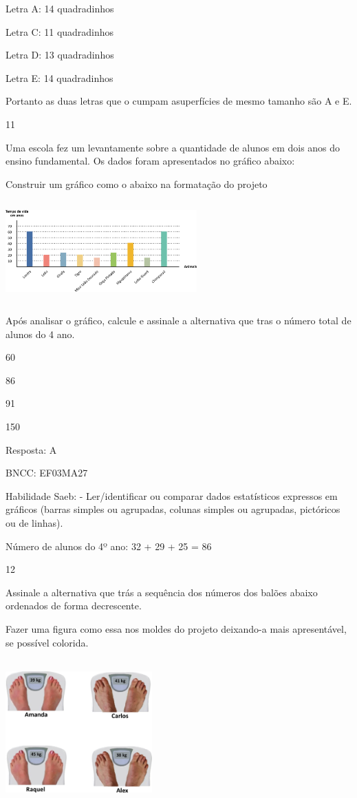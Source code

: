 \begin{escolha}
{\begin{escolha}
{Letra A: 14 quadradinhos

Letra C: 11 quadradinhos

Letra D: 13 quadradinhos

Letra E: 14 quadradinhos

Portanto as duas letras que o cumpam asuperfícies de mesmo tamanho são A
e E.

\num{11}

Uma escola fez um levantamente sobre a quantidade de alunos em dois anos
do ensino fundamental. Os dados foram apresentados no gráfico abaixo:

Construir um gráfico como o abaixo na formatação do projeto

\includegraphics[width=2.89744in,height=1.52156in]{media/image112.png}

Após analisar o gráfico, calcule e assinale a alternativa que tras o
número total de alunos do 4 ano.

\begin{escolha}
\item
  60
\item
  86
\item
  91
\item
  150
\end{escolha}

Resposta: A

BNCC: EF03MA27

Habilidade Saeb: - Ler/identificar ou comparar dados estatísticos
expressos em gráficos (barras simples ou agrupadas, colunas simples ou
agrupadas, pictóricos ou de linhas).

Número de alunos do 4º ano: 32 + 29 + 25 = 86

\num{12}

Assinale a alternativa que trás a sequência dos números dos balões
abaixo ordenados de forma decrescente.

Fazer uma figura como essa nos moldes do projeto deixando-a mais
apresentável, se possível colorida.

\includegraphics[width=2.21686in,height=2.20852in]{media/image113.png}

}
\end{escolha}}
\end{escolha}
